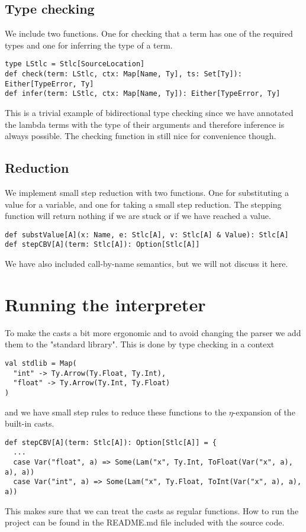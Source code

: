 \documentclass[11pt]{article}
\begin{document}
\subsection{Type checking}
We include two functions. One for checking that a term has one of the required types and one for inferring the type of a term.
\begin{lstlisting}
type LStlc = Stlc[SourceLocation]
def check(term: LStlc, ctx: Map[Name, Ty], ts: Set[Ty]): Either[TypeError, Ty]
def infer(term: LStlc, ctx: Map[Name, Ty]): Either[TypeError, Ty]
\end{lstlisting}
This is a trivial example of bidirectional type checking since we have annotated the lambda terms with the type of their arguments and therefore inference is always possible. The checking function in still nice for convenience though.
\subsection{Reduction}
We implement small step reduction with two functions. One for substituting a value for a variable, and one for taking a small step reduction. The stepping function will return nothing if we are stuck or if we have reached a value.
\begin{lstlisting}
def substValue[A](x: Name, e: Stlc[A], v: Stlc[A] & Value): Stlc[A]
def stepCBV[A](term: Stlc[A]): Option[Stlc[A]]
\end{lstlisting}
We have also included call-by-name semantics, but we will not discuss it here.
\section{Running the interpreter}
To make the casts a bit more ergonomic and to avoid changing the parser we add them to the "standard library". This is done by type checking in a context
\begin{lstlisting}
val stdlib = Map(
  "int" -> Ty.Arrow(Ty.Float, Ty.Int),
  "float" -> Ty.Arrow(Ty.Int, Ty.Float)
)
\end{lstlisting}
and we have small step rules to reduce these functions to the $\eta$-expansion of the built-in casts.
\begin{lstlisting}
def stepCBV[A](term: Stlc[A]): Option[Stlc[A]] = {
  ...
  case Var("float", a) => Some(Lam("x", Ty.Int, ToFloat(Var("x", a), a), a))
  case Var("int", a) => Some(Lam("x", Ty.Float, ToInt(Var("x", a), a), a))
\end{lstlisting}
This makes sure that we can treat the casts as regular functions. How to run the project can be found in the README.md file included with the source code.
\end{document}
